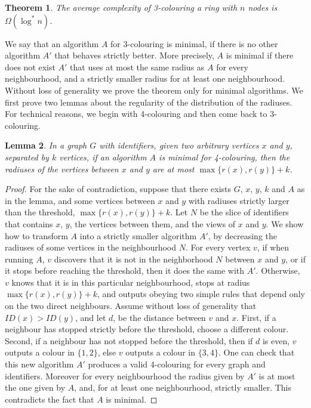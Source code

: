 \documentclass{sig-alternate-2013}
\newtheorem{theorem}{Theorem}
\newtheorem{lemma}[theorem]{Lemma}
\begin{document}
\begin{theorem}\label{thm:col}
The average complexity of 3-colouring a ring with $n$ nodes is $\Omega(\log^*n)$.
\end{theorem} 

We say that an algorithm $A$ for 3-colouring is minimal, if there is no other algorithm $A'$ that behaves strictly better. More precisely, $A$ is minimal if there does not exist $A'$ that uses at most the same radius as $A$ for every neighbourhood, and a strictly smaller radius for at least one neighbourhood. Without loss of generality we prove the theorem only for minimal algorithms. We first prove two lemmas about the regularity of the distribution of the radiuses. For technical reasons, we begin with 4-colouring and then come back to 3-colouring.

\vspace{0.5cm}

\begin{lemma}\label{lem:threshold}
In a graph $G$ with identifiers, given two arbitrary vertices $x$ and $y$, separated by $k$ vertices, if an algorithm $A$ is minimal for 4-colouring, then the radiuses of the vertices between $x$ and $y$ are at most $\max\{r(x),r(y)\}+k$.
\end{lemma}
 
\begin{proof} For the sake of contradiction, suppose that there exists $G$, $x$, $y$, $k$ and $A$ as in the lemma, and some vertices between $x$ and $y$ with radiuses strictly larger than the threshold, $\max\{r(x),r(y)\}+k$. Let $N$ be the slice of identifiers that contains $x$, $y$, the vertices between them, and the views of $x$ and $y$. We show how to transform $A$ into a strictly smaller algorithm $A'$, by decreasing the radiuses of some vertices in the neighbourhood $N$. For every vertex $v$, if when running $A$, $v$ discovers that it is not in the neighborhood $N$ between $x$ and $y$, or if it stops before reaching the threshold, then it does the same with $A'$. Otherwise, $v$ knows that it is in this particular neighbourhood, stops at radius $\max\{r(x),r(y)\}+k$, and outputs obeying two simple rules that depend only on the two direct neighbours. Assume without loss of generality that $ID(x)>ID(y)$, and let $d$, be the distance between $v$ and $x$.
First, if a neighbour has stopped strictly before the threshold, choose a different colour. Second, if a neighbour has not stopped before the threshold, then if $d$ is even, $v$ outputs a colour in $\{1,2\}$, else $v$ outputs a colour in $\{3,4\}$. 
One can check that this new algorithm $A'$ produces a valid 4-colouring for every graph and identifiers. 
Moreover for every neighbourhood the radius given by $A'$ is at most the one given by $A$, and, for at least one neighbourhood, strictly smaller. This contradicts the fact that $A$ is minimal.
\end{proof}
 
\end{document}

